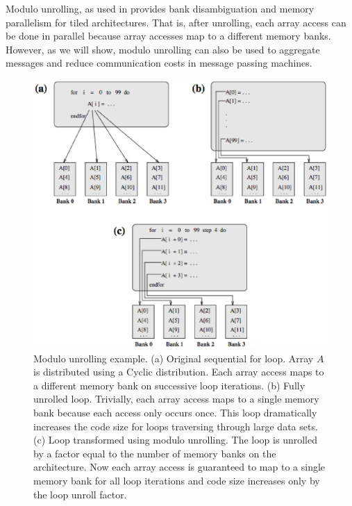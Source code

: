 Modulo unrolling, as used in \cite{barua1999maps} provides bank disambiguation and memory parallelism for tiled architectures. That is, after unrolling, each array access can be done in parallel because array accesses map to a different memory banks. However, as we will show, modulo unrolling can also be used to aggregate messages and reduce communication costs in message passing machines. 

\begin{figure}
\begin{center}
\includegraphics[scale=0.50]{./Figures/modulo_unrolling.eps}
\caption{Modulo unrolling example. (a) Original sequential for loop. Array $A$ is distributed using a Cyclic distribution. Each array access maps to a different memory bank on successive loop iterations. (b) Fully unrolled loop. Trivially, each array access maps to a single memory bank because each access only occurs once. This loop dramatically increases the code size for loops traversing through large data sets. (c) Loop transformed using modulo unrolling. The loop is unrolled by a factor equal to the number of memory banks on the architecture. Now each array access is guaranteed to map to a single memory bank for all loop iterations and code size increases only by the loop unroll factor.}
\label{modulo_unrolling}
\end{center}
\end{figure}


